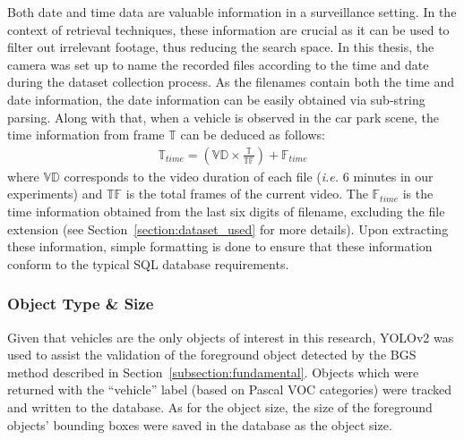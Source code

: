 Both date and time data are valuable information in a surveillance setting. In the context of retrieval techniques, these information are crucial as it can be used to filter out irrelevant footage, thus reducing the search space. In this thesis, the camera was set up to name the recorded files according to the time and date during the dataset collection process. As the filenames contain both the time and date information, the date information can be easily obtained via sub-string parsing. Along with that, when a vehicle is observed in the car park scene, the time information from frame $\mathbb{T}$ can be deduced as follows:
\begin{align}
\label{eq:timecount}
    \mathbb{T}_{time}  = (\mathbb{VD} \times \frac{\mathbb{T}}{\mathbb{TF}}) + \mathbb{F}_{time}
\end{align}
where $\mathbb{VD}$ corresponds to the video duration of each file (\emph{i.e.} 6 minutes in our experiments) and $\mathbb{TF}$ is the total frames of the current video. The $\mathbb{F}_{time}$ is the time information obtained from the last six digits of filename, excluding the file extension (see Section~\ref{section:dataset_used} for more details). Upon extracting these information, simple formatting is done to ensure that these information conform to the typical SQL database requirements.


\vspace{1em}
\subsubsection{Object Type \& Size}
\label{objecttype}
Given that vehicles are the only objects of interest in this research, YOLOv2 was used to assist the validation of the foreground object detected by the BGS method described in Section~\ref{subsection:fundamental}. Objects which were returned with the ``vehicle'' label (based on Pascal VOC categories) were tracked and written to the database. As for the object size, the size of the foreground objects' bounding boxes were saved in the database as the object size.


\section{\versionOneExt}
\label{section:semantic_lsh}

